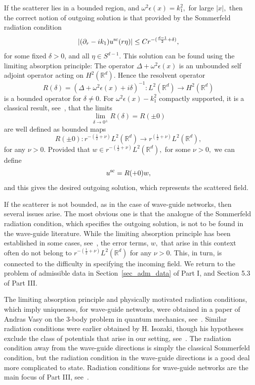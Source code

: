 \documentclass[11pt]{article}
\newcommand\bbR{\mathbb R}
\newcommand\pa{\partial}
\theoremstyle{definition}
\theoremstyle{remark}
\begin{document}
If the scatterer lies in a bounded region, and $\omega^2\epsilon(x)=k_1^2,$ for
large $|x|,$ then the correct notion of outgoing solution is that provided by the
Sommerfeld radiation condition
\begin{equation}
  |(\pa_r-ik_1)u^{\scat}(r\eta)|\leq Cr^{-(\frac{d-1}{2}+\delta)},
\end{equation}
for some fixed $\delta>0$, and all $\eta\in S^{d-1}.$ This solution can be found
using the limiting absorption principle: The operator
$\Delta+\omega^2\epsilon(x)$ is an unbounded self adjoint operator acting on
$H^2(\bbR^d).$ Hence  the resolvent operator
$$R(\delta)=(\Delta+\omega^2\epsilon(x)+i\delta)^{-1}:L^2(\bbR^d)\to H^2(\bbR^d)$$
is a bounded operator for $\delta\neq 0.$ For $\omega^2\epsilon(x)-k_1^2$
compactly supported, it is a classical result,
see~\cite{Agmon}, that the limits
\begin{equation}
  \lim_{\delta\to 0^{\pm}}R(\delta)=R(\pm 0)
\end{equation}
are well defined as bounded maps
$$R(\pm 0):r^{-(\frac 12+\nu)}L^2(\bbR^d)\to r^{(\frac  12+\nu)}L^2(\bbR^d),$$
for any $\nu>0.$ Provided that $w\in r^{-(\frac 12+\nu)}L^2(\bbR^d),$ for some
$\nu>0,$ we can define
\begin{equation}
  u^{\operatorname{sc}}=R(+0)w,
\end{equation}
and this gives the desired outgoing solution, which represents the scattered field.

If the scatterer is not bounded, as in the case of wave-guide networks, then several
issues arise. The most obvious one is that the analogue of the Sommerfeld
radiation condition, which specifies the outgoing solution, is not to be found
in the wave-guide literature. While the limiting absorption principle has been
established in some cases, see~\cite{DeBevierePravica1,DeBevierePravica2}, the
error terms, $w,$ that arise in this context often do not belong to $r^{-(\frac
  12+\nu)}L^2(\bbR^d)$ for any $\nu>0.$ This, in turn, is connected to the difficulty in
specifying the incoming field. We return to the problem of admissible data in
Section~\ref{sec_adm_data} of Part I, and Section 5.3 of Part III.


The limiting absorption principle and  physically motivated radiation
conditions, which imply uniqueness, for wave-guide networks, were obtained in a
paper of Andras Vasy on the 3-body problem in quantum mechanics,
see~\cite{Vasy2000}. Similar radiation conditions were earlier obtained by
H. Isozaki, though his hypotheses exclude the class of potentials that arise in
our setting, see~\cite{Isozaki94}. The radiation condition away from the
wave-guide directions is simply the classical Sommerfeld condition, but the
radiation condition in the wave-guide directions is a good deal more complicated
to state. Radiation conditions for wave-guide networks are the main focus of Part III,
see~\cite{EpMaSR2023}.
\end{document}
